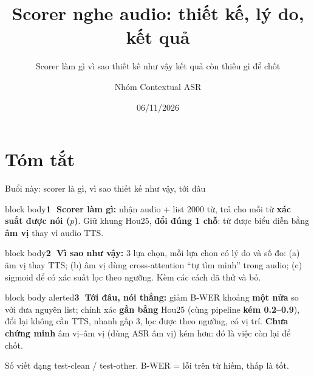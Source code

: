 \documentclass[aspectratio=169,xcolor=table]{beamer}
\title{Scorer nghe audio: thiết kế, lý do, kết quả}
\subtitle{Scorer làm gì \ra{} vì sao thiết kế như vậy \ra{} kết quả \ra{} còn thiếu gì để chốt}
\author{Nhóm Contextual ASR}
\institute{}
\date{06/11/2026}
\newcommand{\hi}[1]{\textcolor{Primary}{\textbf{#1}}}
\newcommand{\bad}[1]{\textcolor{RiskRed}{\textbf{#1}}}
\newcommand{\good}[1]{\textcolor{GoodGreen}{\textbf{#1}}}
\newcommand{\nbox}[2][block body]{\begin{beamercolorbox}[sep=0.45em,rounded=true]{#1}\footnotesize #2\end{beamercolorbox}}
\begin{document}
\begin{frame}[plain]\titlepage\end{frame}

\section{Tóm tắt}
\begin{frame}{Buổi này: scorer là gì, vì sao thiết kế như vậy, tới đâu}
\nbox{\textbf{\textcircled{\scriptsize 1} Scorer làm gì:} nhận audio + list 2000 từ, trả cho mỗi từ \textbf{xác suất được nói ($p$)}. Giữ khung Hou25, \hi{đổi đúng 1 chỗ}: từ được biểu diễn bằng \textbf{âm vị} thay vì audio TTS.}
\vspace{0.15cm}
\nbox{\textbf{\textcircled{\scriptsize 2} Vì sao như vậy:} 3 lựa chọn, mỗi lựa chọn có lý do và số đo: (a) âm vị thay TTS; (b) âm vị dùng cross-attention ``tự tìm mình'' trong audio; (c) sigmoid để có xác suất lọc theo ngưỡng. Kèm các cách đã thử và bỏ.}
\vspace{0.15cm}
\nbox[block body alerted]{\textbf{\textcircled{\scriptsize 3} Tới đâu, nói thẳng:} giảm B-WER khoảng \good{một nửa} so với đưa nguyên list; chính xác \textbf{gần bằng} Hou25 (cùng pipeline \bad{kém 0.2--0.9}), đổi lại không cần TTS, nhanh gấp 3, lọc được theo ngưỡng, có vị trí. \bad{Chưa chứng minh} âm vị--âm vị (dùng ASR âm vị) kém hơn: đó là việc còn lại để chốt.}
\vspace{0.15cm}
{\footnotesize Số viết dạng test-clean / test-other. B-WER = lỗi trên từ hiếm, thấp là tốt.}
\end{frame}
\end{document}
